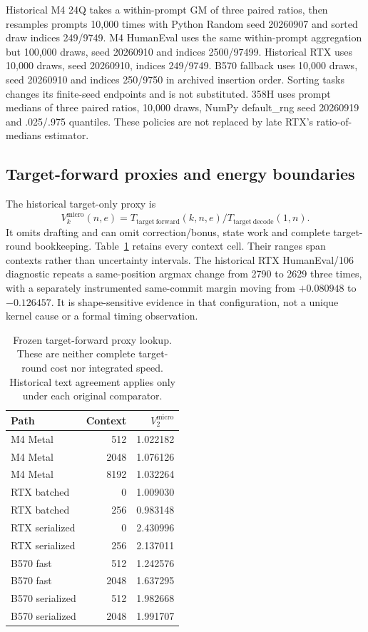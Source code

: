 Historical M4 24Q takes a within-prompt GM of three paired ratios, then resamples prompts 10,000 times with Python Random seed 20260907 and sorted draw indices 249/9749. M4 HumanEval uses the same within-prompt aggregation but 100,000 draws, seed 20260910 and indices 2500/97499. Historical RTX uses 10,000 draws, seed 20260910, indices 249/9749. B570 fallback uses 10,000 draws, seed 20260910 and indices 250/9750 in archived insertion order. Sorting tasks changes its finite-seed endpoints and is not substituted. 358H uses prompt medians of three paired ratios, 10,000 draws, NumPy default\_rng seed 20260919 and .025/.975 quantiles. These policies are not replaced by late RTX's ratio-of-medians estimator.

\subsection{Target-forward proxies and energy boundaries}
The historical target-only proxy is
\[
V_k^{\mathrm{micro}}(n,e)=T_{\mathrm{target\ forward}}(k,n,e)/T_{\mathrm{target\ decode}}(1,n).
\]
It omits drafting and can omit correction/bonus, state work and complete target-round bookkeeping. Table~\ref{tab:proxy_lookup} retains every context cell. Their ranges span contexts rather than uncertainty intervals. The historical RTX HumanEval/106 diagnostic repeats a same-position argmax change from 2790 to 2629 three times, with a separately instrumented same-commit margin moving from $+0.080948$ to $-0.126457$. It is shape-sensitive evidence in that configuration, not a unique kernel cause or a formal timing observation.

\begin{table}[ht]\centering\small
\caption{Frozen target-forward proxy lookup. These are neither complete target-round cost nor integrated speed. Historical text agreement applies only under each original comparator.}
\label{tab:proxy_lookup}
\begin{tabular}{@{}lrr@{}}\toprule
Path & Context & $V_2^{\mathrm{micro}}$\\\midrule
M4 Metal & 512 & 1.022182\\
M4 Metal & 2048 & 1.076126\\
M4 Metal & 8192 & 1.032264\\
RTX batched & 0 & 1.009030\\
RTX batched & 256 & 0.983148\\
RTX serialized & 0 & 2.430996\\
RTX serialized & 256 & 2.137011\\
B570 fast & 512 & 1.242576\\
B570 fast & 2048 & 1.637295\\
B570 serialized & 512 & 1.982668\\
B570 serialized & 2048 & 1.991707\\\bottomrule
\end{tabular}
\end{table}

